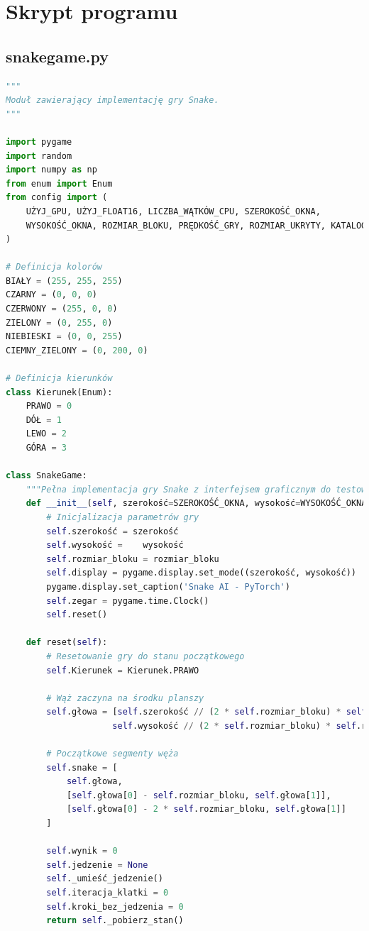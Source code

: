 \documentclass[a4paper,12pt]{article}
\begin{document}
\clearpage
  \section{Skrypt programu}
\subsection{snakegame.py}
\begin{lstlisting}[language=Python]
    """
Moduł zawierający implementację gry Snake.
"""

import pygame
import random
import numpy as np
from enum import Enum
from config import (
    UŻYJ_GPU, UŻYJ_FLOAT16, LICZBA_WĄTKÓW_CPU, SZEROKOŚĆ_OKNA, 
    WYSOKOŚĆ_OKNA, ROZMIAR_BLOKU, PRĘDKOŚĆ_GRY, ROZMIAR_UKRYTY, KATALOG_MODELI
)

# Definicja kolorów
BIAŁY = (255, 255, 255)
CZARNY = (0, 0, 0)
CZERWONY = (255, 0, 0)
ZIELONY = (0, 255, 0)
NIEBIESKI = (0, 0, 255)
CIEMNY_ZIELONY = (0, 200, 0)

# Definicja kierunków
class Kierunek(Enum):
    PRAWO = 0
    DÓŁ = 1
    LEWO = 2
    GÓRA = 3

class SnakeGame:
    """Pełna implementacja gry Snake z interfejsem graficznym do testowania."""
    def __init__(self, szerokość=SZEROKOŚĆ_OKNA, wysokość=WYSOKOŚĆ_OKNA, rozmiar_bloku=ROZMIAR_BLOKU):
        # Inicjalizacja parametrów gry
        self.szerokość = szerokość
        self.wysokość =    wysokość
        self.rozmiar_bloku = rozmiar_bloku
        self.display = pygame.display.set_mode((szerokość, wysokość))
        pygame.display.set_caption('Snake AI - PyTorch')
        self.zegar = pygame.time.Clock()
        self.reset()
    
    def reset(self):
        # Resetowanie gry do stanu początkowego
        self.Kierunek = Kierunek.PRAWO
        
        # Wąż zaczyna na środku planszy
        self.głowa = [self.szerokość // (2 * self.rozmiar_bloku) * self.rozmiar_bloku, 
                     self.wysokość // (2 * self.rozmiar_bloku) * self.rozmiar_bloku]
        
        # Początkowe segmenty węża
        self.snake = [
            self.głowa,
            [self.głowa[0] - self.rozmiar_bloku, self.głowa[1]],
            [self.głowa[0] - 2 * self.rozmiar_bloku, self.głowa[1]]
        ]
        
        self.wynik = 0
        self.jedzenie = None
        self._umieść_jedzenie()
        self.iteracja_klatki = 0
        self.kroki_bez_jedzenia = 0
        return self._pobierz_stan()
    

\end{lstlisting}
\end{document}
